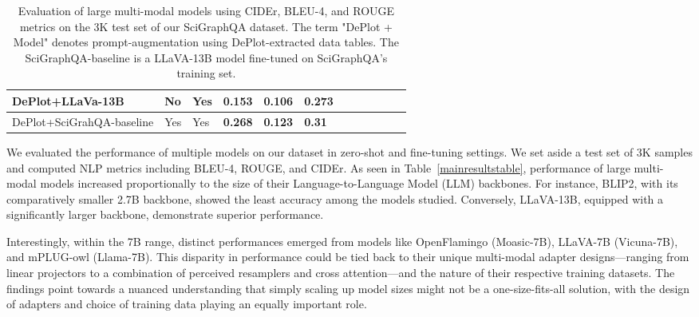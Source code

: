 \documentclass{article}
\begin{document}
\begin{table}[!htbp]
\begin{adjustbox}{max width=\textwidth}
\begin{tabular}{p{4.13cm}p{2.48cm}p{2.48cm}p{2.48cm}p{2.48cm}p{2.48cm}p{4.13cm}p{2.48cm}p{2.48cm}p{2.48cm}p{2.48cm}p{2.48cm}}
\hline
\multicolumn{1}{|p{4.13cm}}{DePlot+LLaVa-13B} & 
\multicolumn{1}{|p{2.48cm}}{No} & 
\multicolumn{1}{|p{2.48cm}}{Yes} & 
\multicolumn{1}{|p{2.48cm}}{0.153} & 
\multicolumn{1}{|p{2.48cm}}{0.106} & 
\multicolumn{1}{|p{2.48cm}|}{0.273} \\ 
\hline
\multicolumn{1}{|p{4.13cm}}{DePlot+SciGrahQA-baseline} & 
\multicolumn{1}{|p{2.48cm}}{Yes} & 
\multicolumn{1}{|p{2.48cm}}{Yes} & 
\multicolumn{1}{|p{2.48cm}}{\textbf{0.268}} & 
\multicolumn{1}{|p{2.48cm}}{\textbf{0.123}} & 
\multicolumn{1}{|p{2.48cm}|}{\textbf{0.31}} \\ 
\hline
\end{tabular}
\end{adjustbox}
\caption{Evaluation of large multi-modal models using CIDEr, BLEU-4, and ROUGE metrics on the 3K test set of our SciGraphQA dataset. The term "DePlot + {Model}" denotes prompt-augmentation using DePlot-extracted data tables. The SciGraphQA-baseline is a LLaVA-13B model fine-tuned on SciGraphQA's  training set.}
\label{tab:evaluation_large_multimodal_models_performance}\end{table}
We evaluated the performance of multiple models on our dataset in zero-shot and fine-tuning settings. We set aside a test set of 3K samples and computed NLP metrics including BLEU-4, ROUGE, and CIDEr. As seen in Table~\ref{mainresultstable}, performance of large multi-modal models increased proportionally to the size of their Language-to-Language Model (LLM) backbones. For instance, BLIP2, with its comparatively smaller 2.7B backbone, showed the least accuracy among the models studied. Conversely, LLaVA-13B, equipped with a significantly larger backbone, demonstrate superior performance.

Interestingly, within the 7B range, distinct performances emerged from models like OpenFlamingo (Moasic-7B), LLaVA-7B (Vicuna-7B), and mPLUG-owl (Llama-7B). This disparity in performance could be tied back to their unique multi-modal adapter designs—ranging from linear projectors to a combination of perceived resamplers and cross attention—and the nature of their respective training datasets. The findings point towards a nuanced understanding that simply scaling up model sizes might not be a one-size-fits-all solution, with the design of adapters and choice of training data playing an equally important role.
\end{document}

